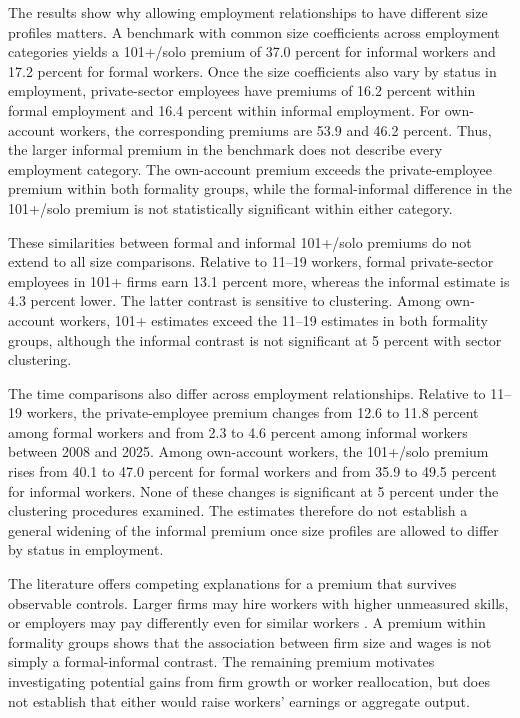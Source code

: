 The results show why allowing employment relationships to have different size profiles matters. A benchmark with common size coefficients across employment categories yields a 101+/solo premium of 37.0 percent for informal workers and 17.2 percent for formal workers. Once the size coefficients also vary by status in employment, private-sector employees have premiums of 16.2 percent within formal employment and 16.4 percent within informal employment. For own-account workers, the corresponding premiums are 53.9 and 46.2 percent. Thus, the larger informal premium in the benchmark does not describe every employment category. The own-account premium exceeds the private-employee premium within both formality groups, while the formal-informal difference in the 101+/solo premium is not statistically significant within either category.

These similarities between formal and informal 101+/solo premiums do not extend to all size comparisons. Relative to 11--19 workers, formal private-sector employees in 101+ firms earn 13.1 percent more, whereas the informal estimate is 4.3 percent lower. The latter contrast is sensitive to clustering. Among own-account workers, 101+ estimates exceed the 11--19 estimates in both formality groups, although the informal contrast is not significant at 5 percent with sector clustering.

The time comparisons also differ across employment relationships. Relative to 11--19 workers, the private-employee premium changes from 12.6 to 11.8 percent among formal workers and from 2.3 to 4.6 percent among informal workers between 2008 and 2025. Among own-account workers, the 101+/solo premium rises from 40.1 to 47.0 percent for formal workers and from 35.9 to 49.5 percent for informal workers. None of these changes is significant at 5 percent under the clustering procedures examined. The estimates therefore do not establish a general widening of the informal premium once size profiles are allowed to differ by status in employment.

The literature offers competing explanations for a premium that survives observable controls. Larger firms may hire workers with higher unmeasured skills, or employers may pay differently even for similar workers \citep{BrownMedoff1989,OiIdson1999,AbowdKramarzMargolis1999,CardHeiningKline2013,ElBadaouiStroblWalsh2010,BalkanTumen2016}. A premium within formality groups shows that the association between firm size and wages is not simply a formal-informal contrast. The remaining premium motivates investigating potential gains from firm growth or worker reallocation, but does not establish that either would raise workers' earnings or aggregate output.


